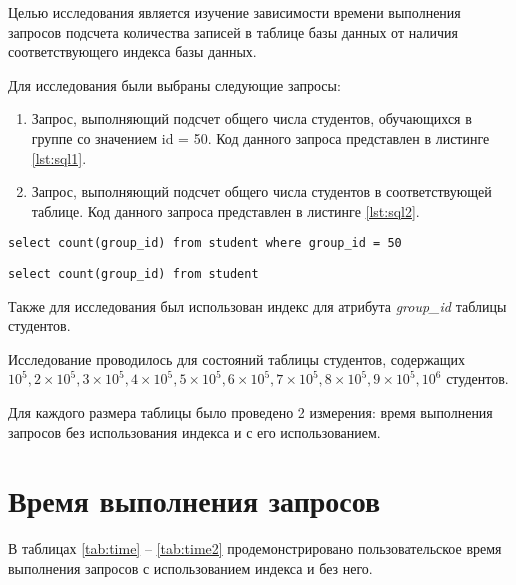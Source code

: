 Целью исследования является изучение зависимости времени выполнения запросов подсчета количества записей в таблице базы данных от наличия соответствующего индекса базы данных.

Для исследования были выбраны следующие запросы:
\begin{enumerate}
	\item Запрос, выполняющий подсчет общего числа студентов, обучающихся в группе со значением id = 50. Код данного запроса представлен в листинге \ref{lst:sql1}.
	\item Запрос, выполняющий подсчет общего числа студентов в соответствующей таблице. Код данного запроса представлен в листинге \ref{lst:sql2}.
\end{enumerate}

\begin{lstlisting}[label=lst:sql1, caption=Листинг запроса\, выполняющего поиск числа студентов\, обучающихся в группе со значением  id равном 50]
select count(group_id) from student where group_id = 50
\end{lstlisting}

\begin{lstlisting}[label=lst:sql2, caption=Листинг запроса\, выполняющего поиск общего числа студентов в соответствующей таблице]
select count(group_id) from student 
\end{lstlisting}

Также для исследования был использован индекс для атрибута \textit{group\_id} таблицы студентов.

Исследование проводилось для состояний таблицы студентов, содержащих $10^5, 2\times10^5, 3\times10^5,  4\times10^5, 5\times10^5, 6\times10^5, 7\times10^5, 8\times10^5, 9\times10^5, 10^6$ студентов.

Для каждого размера таблицы было проведено 2 измерения:  время выполнения запросов без использования индекса и с его использованием.

\clearpage
\section{Время выполнения запросов}

В таблицах \ref{tab:time} -- \ref{tab:time2} продемонстрировано пользовательское время выполнения запросов с использованием индекса и без него.

